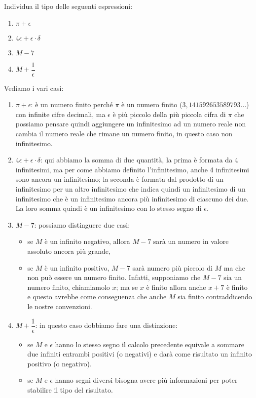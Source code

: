 \begin{esempio}
 Individua il tipo delle seguenti espressioni:

\begin{multicols}{4}
\begin{enumerate} [nosep]
 \item \(\pi+\epsilon\)
 \item \(4\epsilon+\epsilon \cdot \delta\)
 \item \(M-7\)
 \item \(M+\dfrac{1}{\epsilon}\)
\end{enumerate}
\end{multicols}

Vediamo i vari casi:

\begin{enumerate}
 \item \(\pi+\epsilon\): 
è un numero finito perché \(\pi\) è un numero 
finito (\(3,141592653589793\dots\)) con infinite cifre decimali, ma 
\(\epsilon\) è più piccolo della più piccola cifra di \(\pi\) che possiamo 
pensare quindi aggiungere un infinitesimo ad un numero reale non cambia il 
numero reale che rimane un numero finito, in questo caso non infinitesimo.
 \item  \(4\epsilon+\epsilon \cdot \delta\): 
qui abbiamo la somma di due quantità, 
la prima è formata da 4 infinitesimi, ma per come abbiamo definito 
l'infinitesimo, anche 4 infinitesimi sono ancora un infinitesimo; la 
seconda è formata dal prodotto di un infinitesimo per un altro infinitesimo 
che indica quindi un infinitesimo di un infinitesimo che è un infinitesimo 
ancora più infinitesimo di ciascuno dei due. La loro somma quindi è un 
infinitesimo con lo stesso segno di \(\epsilon\).
 \item \(M-7\):
possiamo distinguere due casi: 
 \begin{itemize} [noitemsep]
  \item se \(M\) è un infinito negativo, allora 
\(M-7\) sarà un numero in valore assoluto ancora più grande, 
 \item se \(M\) è un infinito positivo, \(M-7\) sarà numero più piccolo di 
\(M\) ma che non può essere un numero finito. 
Infatti, supponiamo che \(M-7\) sia un numero finito, chiamiamolo \(x\); ma 
se \(x\) è finito allora anche \(x+7\) è finito e questo avrebbe come 
conseguenza che anche \(M\) sia finito contraddicendo le nostre convenzioni.
 \end{itemize}
 \item \(M+\dfrac{1}{\epsilon}\):
 in questo caso dobbiamo fare una distinzione:
 \begin{itemize} [noitemsep]
  \item se \(M\) e \(\epsilon\) hanno lo stesso segno il calcolo precedente 
equivale a sommare due infiniti entrambi positivi (o negativi) e darà come 
risultato un infinito positivo (o negativo).
  \item se \(M\) e \(\epsilon\) hanno segni diversi bisogna avere più 
informazioni per poter stabilire il tipo del risultato.
 \end{itemize}


\end{enumerate}
\end{esempio}
